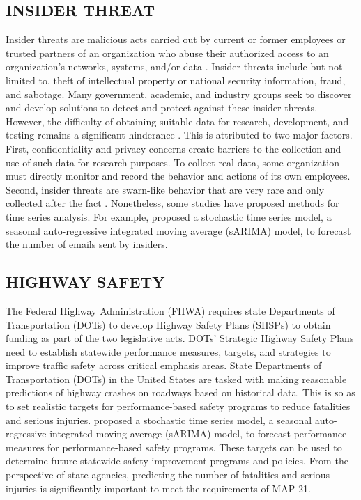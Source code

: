 \documentclass[letterpaper]{article}
\begin{document}

\subsection{INSIDER THREAT}\label{insider-threat}

Insider threats are malicious acts carried out by current or former employees or trusted partners of an organization who abuse their authorized access to an organization's networks, systems, and/or data \citep{glasser2013bridging, lindauer2014generating}. Insider threats include but not limited to, theft of intellectual property or national security information, fraud, and sabotage. Many government, academic, and industry groups seek to discover and develop solutions to detect and protect against these insider threats. However, the difficulty of obtaining suitable data for research, development, and testing remains a significant hinderance \citep{glasser2013bridging}. This is attributed to two major factors. First, confidentiality and privacy concerns create barriers to the collection and use of such data for research purposes. To collect real data, some organization must directly monitor and record the behavior and actions of its own employees. Second, insider threats are swarn-like behavior that are very rare and only collected after the fact \citep{gheyas2016detection}. Nonetheless, some studies have proposed methods for time series analysis. For example, \cite{stoffel2013finding} proposed a stochastic time series model, a seasonal auto-regressive integrated moving average (sARIMA) model, to forecast the number of emails sent by insiders.

 

\subsection{HIGHWAY SAFETY}\label{highway-crash-safety}
The Federal Highway Administration (FHWA) requires state Departments of Transportation (DOTs) to develop Highway Safety Plans (SHSPs) to obtain funding as part of the two legislative acts. DOTs' Strategic Highway Safety Plans need to establish statewide performance measures, targets, and strategies to improve traffic safety across critical emphasis areas. State Departments of Transportation (DOTs) in the United States are tasked with making reasonable predictions of highway crashes on roadways based on historical data. This is so as to set realistic targets for performance-based safety programs to reduce fatalities and serious injuries. \cite{veeramisti2016business} proposed a stochastic time series model, a seasonal auto-regressive integrated moving average (sARIMA) model, to forecast performance measures for performance-based safety programs. These targets can be used to determine future statewide safety improvement programs and policies. From the perspective of state agencies, predicting the number of fatalities and serious injuries is significantly important to meet the requirements of MAP-21.%
\end{document}
